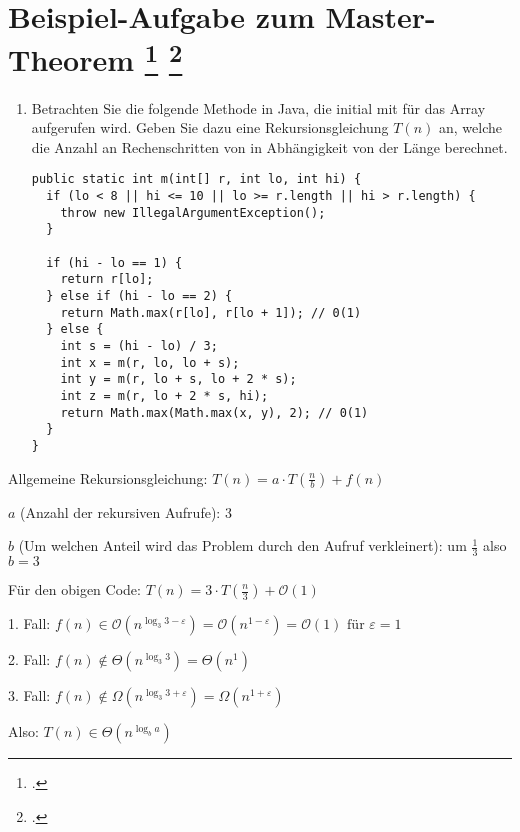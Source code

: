 \documentclass{lehramt-informatik-aufgabe}
\begin{document}

\section{Beispiel-Aufgabe zum Master-Theorem 
\footcite[Seite 39 (PDF 26)]{aud:fs:2}
\footcite[Thema 2 Aufgabe 6]{examen:66115:2018:03}
}

\begin{enumerate}

\item Betrachten Sie die folgende Methode  in Java, die
initial mit  für das Array 
aufgerufen wird. Geben Sie dazu eine Rekursionsgleichung $T(n)$ an,
welche die Anzahl an Rechenschritten von  in Abhängigkeit
von der Länge  berechnet.

\begin{verbatim}
public static int m(int[] r, int lo, int hi) {
  if (lo < 8 || hi <= 10 || lo >= r.length || hi > r.length) {
    throw new IllegalArgumentException();
  }

  if (hi - lo == 1) {
    return r[lo];
  } else if (hi - lo == 2) {
    return Math.max(r[lo], r[lo + 1]); // 0(1)
  } else {
    int s = (hi - lo) / 3;
    int x = m(r, lo, lo + s);
    int y = m(r, lo + s, lo + 2 * s);
    int z = m(r, lo + 2 * s, hi);
    return Math.max(Math.max(x, y), 2); // 0(1)
  }
}
\end{verbatim}
\end{enumerate}

\begin{liAntwort}

Allgemeine Rekursionsgleichung: $T(n) = a \cdot T(\frac{n}{b}) + f(n)$

$a$ (Anzahl der rekursiven Aufrufe): 3

$b$ (Um welchen Anteil wird das Problem durch den Aufruf verkleinert):
um $\frac{1}{3}$ also $b = 3$

Für den obigen Code:  $T(n) = 3 \cdot T(\frac{n}{3}) + \mathcal{O}(1)$

1. Fall:
$f(n) \in \mathcal{O}\left(n^{\log_{3}3-\varepsilon}\right) =
\mathcal{O}\left(n^{1-\varepsilon}\right) =
\mathcal{O}\left(1\right) \text{ für } \varepsilon = 1
$

2. Fall:
$f(n) \notin \Theta \left(n^{{\log_{3}3}}\right) =
\Theta \left(n^1\right)
$

3. Fall:
$f(n) \notin \Omega \left(n^{\log_{3}3 + \varepsilon}\right) =
\Omega \left(n^{1 + \varepsilon}\right)$

Also: $T(n)\in \Theta \left(n^{\log_{b}a}\right)$
\end{liAntwort}
\end{document}
